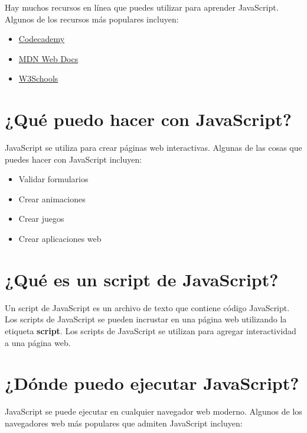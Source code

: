 \documentclass[
  a4paper,
  DIV=11,
  numbers=noendperiod,
  onepage,
  openany]{scrreprt}
\providecommand{\tightlist}{%
  \setlength{\itemsep}{0pt}\setlength{\parskip}{0pt}}\usepackage{longtable,booktabs,array}
\begin{document}
Hay muchos recursos en línea que puedes utilizar para aprender
JavaScript. Algunos de los recursos más populares incluyen:

\begin{itemize}
\tightlist
\item
  \href{https://www.codecademy.com/learn/introduction-to-javascript}{Codecademy}
\item
  \href{https://developer.mozilla.org/en-US/docs/Web/JavaScript}{MDN Web
  Docs}
\item
  \href{https://www.w3schools.com/js/default.asp}{W3Schools}
\end{itemize}

\section{¿Qué puedo hacer con
JavaScript?}\label{quuxe9-puedo-hacer-con-javascript}

JavaScript se utiliza para crear páginas web interactivas. Algunas de
las cosas que puedes hacer con JavaScript incluyen:

\begin{itemize}
\tightlist
\item
  Validar formularios
\item
  Crear animaciones
\item
  Crear juegos
\item
  Crear aplicaciones web
\end{itemize}

\section{¿Qué es un script de
JavaScript?}\label{quuxe9-es-un-script-de-javascript}

Un script de JavaScript es un archivo de texto que contiene código
JavaScript. Los scripts de JavaScript se pueden incrustar en una página
web utilizando la etiqueta \textbf{script}. Los scripts de JavaScript se
utilizan para agregar interactividad a una página web.

\section{¿Dónde puedo ejecutar
JavaScript?}\label{duxf3nde-puedo-ejecutar-javascript}

JavaScript se puede ejecutar en cualquier navegador web moderno. Algunos
de los navegadores web más populares que admiten JavaScript incluyen:
\end{document}
